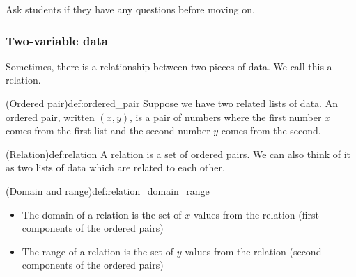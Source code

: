 \documentclass{article}
\begin{document}
\begin{directions}
    Ask students if they have any questions before moving on.
\end{directions}

\subsubsection{Two-variable data}

Sometimes, there is a relationship between two pieces of data. We call this a relation.

\begin{definition}{(Ordered pair)}{def:ordered_pair}
    Suppose we have two related lists of data. An ordered pair, written $(x,y)$, is a pair of numbers where the first number $x$ comes from the first list and the second number $y$ comes from the second.
\end{definition}

\begin{definition}{(Relation)}{def:relation}
    A relation is a set of ordered pairs. We can also think of it as two lists of data which are related to each other.
\end{definition}

\begin{definition}{(Domain and range)}{def:relation_domain_range}
    \begin{itemize}
        \item The domain of a relation is the set of $x$ values from the relation (first components of the ordered pairs)
        \item The range of a relation is the set of $y$ values from the relation (second components of the ordered pairs)
    \end{itemize}
\end{definition}
\end{document}
